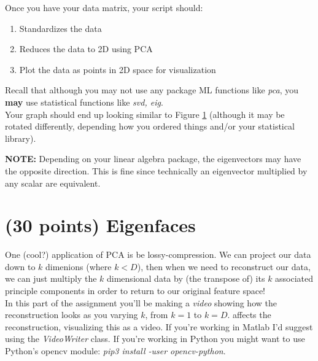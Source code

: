\documentclass[12pt]{article}
\begin{document}
\noindent
Once you have your data matrix, your script should:
\begin{enumerate}
  \item Standardizes the data
  \item Reduces the data to 2D using PCA
  \item Plot the data as points in 2D space for visualization
\end{enumerate}

\noindent
Recall that although you may not use any package ML functions like \emph{pca}, you \textbf{may} use statistical functions like \emph{svd, eig}.\\

\noindent
Your graph should end up looking similar to Figure \ref{PCA} (although it may be rotated differently, depending how you ordered things and/or your statistical library).
\begin{figure}[H]
\begin{center}
\label{PCA}
\end{center}
\end{figure}

\textbf{NOTE:} Depending on your linear algebra package, the eigenvectors may have the opposite direction.  This is fine since technically an eigenvector multiplied by any scalar are equivalent.

\newpage
\section{(30 points) Eigenfaces}\label{eigenface}
One (cool?) application of PCA is be lossy-compression.   We can project our data down to $k$ dimenions (where $k<D$), then when we need to reconstruct our data, we can just multiply the $k$ dimensional data by (the transpose of) its $k$ associated principle components in order to return to our original feature space!\\

\noindent
In this part of the assignment you'll be making a \emph{video} showing how the reconstruction looks as you varying $k$, from $k=1$ to $k=D$. affects the reconstruction, visualizing this as a video.  If you're working in Matlab I'd suggest using the \emph{VideoWriter} class.  If you're working in Python you might want to use Python's opencv module:  \emph{pip3 install -user opencv-python}.

\noindent
\end{document}
